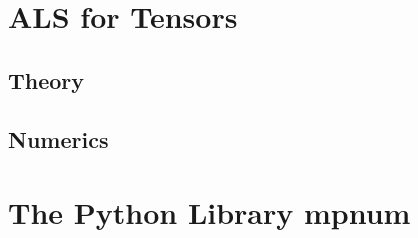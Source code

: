 \section{ALS for Tensors}
\subsection{Theory}
\subsection{Numerics}

\section{The Python Library mpnum}

